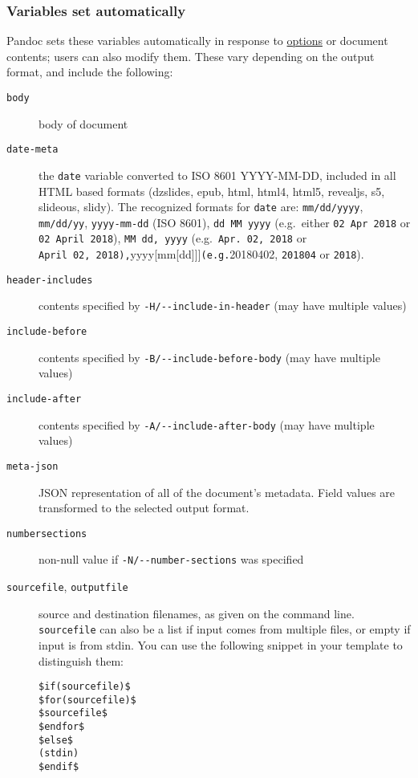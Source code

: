 \documentclass[]{article}
\begin{document}
\hypertarget{variables-set-automatically}{%
\subsubsection{Variables set
automatically}\label{variables-set-automatically}}

Pandoc sets these variables automatically in response to
\protect\hyperlink{options}{options} or document contents; users can
also modify them. These vary depending on the output format, and include
the following:

\begin{description}
\item[\texttt{body}]
body of document
\item[\texttt{date-meta}]
the \texttt{date} variable converted to ISO 8601 YYYY-MM-DD, included in
all HTML based formats (dzslides, epub, html, html4, html5, revealjs,
s5, slideous, slidy). The recognized formats for \texttt{date} are:
\texttt{mm/dd/yyyy}, \texttt{mm/dd/yy}, \texttt{yyyy-mm-dd} (ISO 8601),
\texttt{dd\ MM\ yyyy} (e.g.~either \texttt{02\ Apr\ 2018} or
\texttt{02\ April\ 2018}), \texttt{MM\ dd,\ yyyy}
(e.g.~\texttt{Apr.\ 02,\ 2018} or
\texttt{April\ 02,\ 2018),}yyyy{[}mm{[}dd{]}{]}{]}\texttt{(e.g.}20180402,
\texttt{201804} or \texttt{2018}).
\item[\texttt{header-includes}]
contents specified by \texttt{-H/-\/-include-in-header} (may have
multiple values)
\item[\texttt{include-before}]
contents specified by \texttt{-B/-\/-include-before-body} (may have
multiple values)
\item[\texttt{include-after}]
contents specified by \texttt{-A/-\/-include-after-body} (may have
multiple values)
\item[\texttt{meta-json}]
JSON representation of all of the document's metadata. Field values are
transformed to the selected output format.
\item[\texttt{numbersections}]
non-null value if \texttt{-N/-\/-number-sections} was specified
\item[\texttt{sourcefile}, \texttt{outputfile}]
source and destination filenames, as given on the command line.
\texttt{sourcefile} can also be a list if input comes from multiple
files, or empty if input is from stdin. You can use the following
snippet in your template to distinguish them:

\begin{verbatim}
$if(sourcefile)$
$for(sourcefile)$
$sourcefile$
$endfor$
$else$
(stdin)
$endif$
\end{verbatim}


\end{description}
\end{document}

